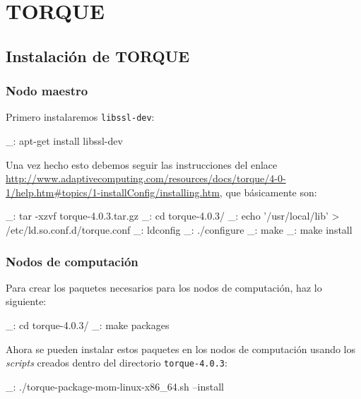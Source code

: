 \chapter{TORQUE}
\label{anx:torque}


\section{Instalación de TORQUE}


\subsection{Nodo maestro}

Primero instalaremos \texttt{libssl-dev}:

\begin{bashcode}
_: apt-get install libssl-dev
\end{bashcode}

Una vez hecho esto debemos seguir las instrucciones del enlace \url{http://www.adaptivecomputing.com/resources/docs/torque/4-0-1/help.htm#topics/1-installConfig/installing.htm}, que básicamente son:

\begin{bashcode}
_: tar -xzvf torque-4.0.3.tar.gz
_: cd torque-4.0.3/
_: echo '/usr/local/lib' > /etc/ld.so.conf.d/torque.conf
_: ldconfig
_: ./configure
_: make
_: make install
\end{bashcode}


\subsection{Nodos de computación}

Para crear los paquetes necesarios para los nodos de computación, haz lo siguiente:

\begin{bashcode}
_: cd torque-4.0.3/
_: make packages
\end{bashcode}

Ahora se pueden instalar estos paquetes en los nodos de computación usando los \emph{scripts} creados dentro del directorio \texttt{torque-4.0.3}:

\begin{bashcode}
_: ./torque-package-mom-linux-x86_64.sh --install
\end{bashcode}

